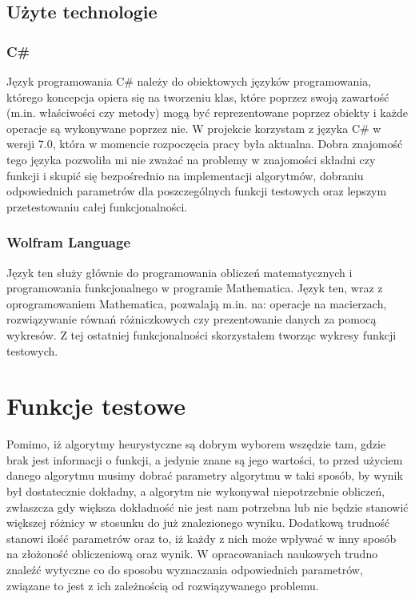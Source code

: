 \documentclass[twoside]{projektInzynierskiMS1}
\newcommand{\si}{ś}
\begin{document}
	\subsection{Użyte technologie}
	\subsubsection{C\#}
Język programowania C\# należy do obiektowych języków programowania, którego koncepcja opiera się na tworzeniu klas, które poprzez swoją zawarto\si ć (m.in. wła\si ciwo\si ci czy metody) mogą być reprezentowane poprzez obiekty i każde operacje są wykonywane poprzez nie. W projekcie korzystam z języka C\# w wersji 7.0, która w momencie rozpoczęcia pracy była aktualna. Dobra znajomo\si ć tego języka pozwoliła mi nie zważać na problemy w znajomo\si ci składni czy funkcji i skupić się bezpo\si rednio na implementacji algorytmów, dobraniu odpowiednich parametrów dla poszczególnych funkcji testowych oraz lepszym przetestowaniu całej funkcjonalno\si ci.

\subsubsection{Wolfram Language}
Język ten służy głównie do programowania obliczeń matematycznych i programowania funkcjonalnego w programie Mathematica. Język ten, wraz z oprogramowaniem Mathematica, pozwalają m.in. na: operacje na macierzach, rozwiązywanie równań różniczkowych czy prezentowanie danych za pomocą wykresów. Z tej ostatniej funkcjonalno\si ci skorzystałem tworząc wykresy funkcji testowych.

\section{Funkcje testowe}
Pomimo, iż algorytmy heurystyczne są dobrym wyborem wszędzie tam, gdzie brak jest informacji o funkcji, a jedynie znane są jego warto\si ci, to przed użyciem danego algorytmu musimy dobrać parametry algorytmu w taki sposób, by wynik był dostatecznie dokładny, a algorytm nie wykonywał niepotrzebnie obliczeń, zwłaszcza gdy większa dokładno\si ć nie jest nam potrzebna lub nie będzie stanowić większej różnicy w stosunku do już znalezionego wyniku. Dodatkową trudno\si ć stanowi ilo\si ć parametrów oraz to, iż każdy z nich może wpływać w inny sposób na złożono\si ć obliczeniową oraz wynik. W opracowaniach naukowych trudno znaleźć wytyczne co do sposobu wyznaczania odpowiednich parametrów, związane to jest z ich zależno\si cią od rozwiązywanego problemu. \\
\end{document}
